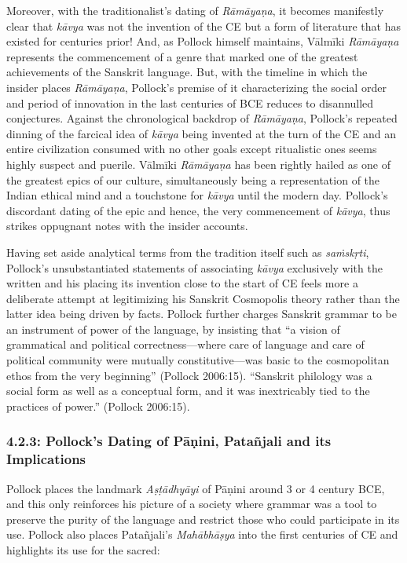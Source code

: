 Moreover, with the traditionalist’s dating of \textit{Rāmāyaṇa}, it becomes manifestly clear that \textit{kāvya} was not the invention of the CE but a form of literature that has existed for centuries prior! And, as Pollock himself maintains, Vālmīki \textit{Rāmāyaṇa} represents the commencement of a genre that marked one of the greatest achievements of the Sanskrit language. But, with the timeline in which the insider places \textit{Rāmāyaṇa}, Pollock’s premise of it characterizing the social order and period of innovation in the last centuries of BCE reduces to disannulled conjectures. Against the chronological backdrop of \textit{Rāmāyaṇa}, Pollock’s repeated dinning of the farcical idea of \textit{kāvya} being invented at the turn of the CE and an entire civilization consumed with no other goals except ritualistic ones seems highly suspect and puerile. Vālmīki \textit{Rāmāyaṇa} has been rightly hailed as one of the greatest epics of our culture, simultaneously being a representation of the Indian ethical mind and a touchstone for \textit{kāvya} until the modern day. Pollock’s discordant dating of the epic and hence, the very commencement of \textit{kāvya}, thus strikes oppugnant notes with the insider accounts.

Having set aside analytical terms from the tradition itself such as \textit{saṁskṛti}, Pollock’s unsubstantiated statements of associating \textit{kāvya} exclusively with the written and his placing its invention close to the start of CE feels more a deliberate attempt at legitimizing his Sanskrit Cosmopolis theory rather than the latter idea being driven by facts. Pollock further charges Sanskrit grammar to be an instrument of power of the language, by insisting that “a vision of grammatical and political correctness—where care of language and care of political community were mutually constitutive—was basic to the cosmopolitan ethos from the very beginning” (Pollock 2006:15). “Sanskrit philology was a social form as well as a conceptual form, and it was inextricably tied to the practices of power.” (Pollock 2006:15).


\subsubsection*{4.2.3: Pollock’s Dating of Pāṇini, Patañjali and its Implications}

Pollock places the landmark \textit{Aṣṭādhyāyi} of Pāṇini around 3 or 4 century BCE, and this only reinforces his picture of a society where grammar was a tool to preserve the purity of the language and restrict those who could participate in its use. Pollock also places Patañjali’s \textit{Mahābhāṣya} into the first centuries of CE and highlights its use for the sacred:


